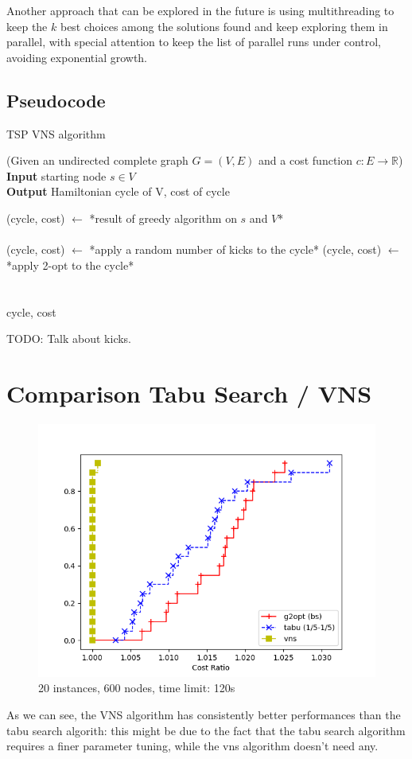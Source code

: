Another approach that can be explored in the future is using multithreading to keep the $k$ best choices among the solutions found and keep exploring them in parallel, with special attention to keep the list of parallel runs under control, avoiding exponential growth.

\newpage

\subsection{Pseudocode}

\begin{algorithm}
    \caption{TSP VNS algorithm}
    (Given an undirected complete graph $G=(V,E)$ and a cost function $c:E\rightarrow\mathbb{R}$)\\
    
    \textbf{Input} starting node $s\in V$\\
    \textbf{Output} Hamiltonian cycle of V, cost of cycle\\
    \begin{algorithmic}
        
        \State (cycle, cost) $\gets$ *result of greedy algorithm on $s$ and $V$*\\

        \\

            \State (cycle, cost) $\gets$ *apply a random number of kicks to the cycle*
            \State (cycle, cost) $\gets$ *apply 2-opt to the cycle*\\

        \EndWhile\\\\

        \Return cycle, cost
    \end{algorithmic}
\end{algorithm}

TODO: Talk about kicks.\\

\section{Comparison Tabu Search / VNS}

\FloatBarrier
\begin{figure}[h]
    \centering
    \includegraphics*[width=.6\textwidth]{../plots/perfprof_met_costs_result.png}
    \caption*{20 instances, 600 nodes, time limit: 120s}
\end{figure}

As we can see, the VNS algorithm has consistently better performances than the tabu search algorith: this might be due to the fact that the tabu search algorithm requires a finer parameter tuning, while the vns algorithm doesn't need any.